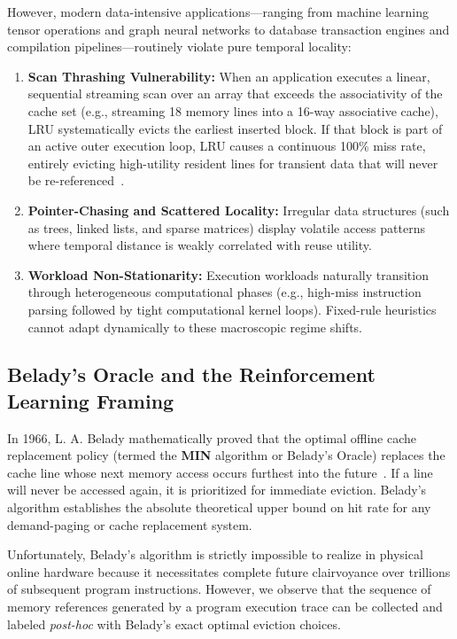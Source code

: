 \documentclass[conference]{IEEEtran}
\begin{document}
However, modern data-intensive applications---ranging from machine learning tensor operations and graph neural networks to database transaction engines and compilation pipelines---routinely violate pure temporal locality:
\begin{enumerate}
    \item \textbf{Scan Thrashing Vulnerability:} When an application executes a linear, sequential streaming scan over an array that exceeds the associativity of the cache set (e.g., streaming 18 memory lines into a 16-way associative cache), LRU systematically evicts the earliest inserted block. If that block is part of an active outer execution loop, LRU causes a continuous 100\% miss rate, entirely evicting high-utility resident lines for transient data that will never be re-referenced~\cite{jaleel2010high}.
    \item \textbf{Pointer-Chasing and Scattered Locality:} Irregular data structures (such as trees, linked lists, and sparse matrices) display volatile access patterns where temporal distance is weakly correlated with reuse utility.
    \item \textbf{Workload Non-Stationarity:} Execution workloads naturally transition through heterogeneous computational phases (e.g., high-miss instruction parsing followed by tight computational kernel loops). Fixed-rule heuristics cannot adapt dynamically to these macroscopic regime shifts.
\end{enumerate}
\subsection{Belady's Oracle and the Reinforcement Learning Framing}
In 1966, L. A. Belady mathematically proved that the optimal offline cache replacement policy (termed the \textbf{MIN} algorithm or Belady's Oracle) replaces the cache line whose next memory access occurs furthest into the future~\cite{belady1966study}. If a line will never be accessed again, it is prioritized for immediate eviction. Belady's algorithm establishes the absolute theoretical upper bound on hit rate for any demand-paging or cache replacement system.

Unfortunately, Belady's algorithm is strictly impossible to realize in physical online hardware because it necessitates complete future clairvoyance over trillions of subsequent program instructions. However, we observe that the sequence of memory references generated by a program execution trace can be collected and labeled \textit{post-hoc} with Belady's exact optimal eviction choices.
\end{document}
